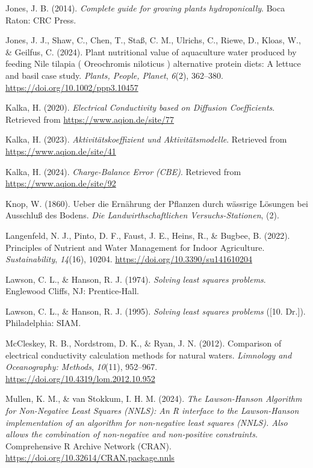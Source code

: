 \documentclass[
  letterpaper,
  DIV=11,
  numbers=noendperiod]{scrreprt}
\newlength{\cslhangindent}
\newenvironment{CSLReferences}[2] %
 {\begin{list}{}{%
  \setlength{\itemindent}{0pt}
  \setlength{\leftmargin}{0pt}
  \setlength{\parsep}{0pt}
  \ifodd #1
   \setlength{\leftmargin}{\cslhangindent}
   \setlength{\itemindent}{-1\cslhangindent}
  \fi
  \setlength{\itemsep}{#2\baselineskip}}}
 {\end{list}}
\begin{document}
\begin{CSLReferences}{1}{0}
Jones, J. B. (2014). \emph{{Complete guide for growing plants
hydroponically}}. Boca Raton: {CRC Press}.

Jones, J. J., Shaw, C., Chen, T., Staß, C. M., Ulrichs, C., Riewe, D.,
Kloas, W., \& Geilfus, C. (2024). {Plant nutritional value of
aquaculture water produced by feeding Nile tilapia ( Oreochromis
niloticus ) alternative protein diets: A lettuce and basil case study}.
\emph{{Plants, People, Planet}}, \emph{6}(2), 362--380.
\url{https://doi.org/10.1002/ppp3.10457}

Kalka, H. (2020). \emph{{Electrical Conductivity based on Diffusion
Coefficients}}. Retrieved from \url{https://www.aqion.de/site/77}

Kalka, H. (2023). \emph{{Aktivit{ä}tskoeffizient und
Aktivit{ä}tsmodelle}}. Retrieved from \url{https://www.aqion.de/site/41}

Kalka, H. (2024). \emph{{Charge-Balance Error (CBE)}}. Retrieved from
\url{https://www.aqion.de/site/92}

Knop, W. (1860). {Ueber die Ern{ä}hrung der Pflanzen durch w{ä}ssrige
L{ö}sungen bei Ausschlu{ß} des Bodens}. \emph{{Die Landwirthschaftlichen
Versuchs-Stationen}}, (2).

Langenfeld, N. J., Pinto, D. F., Faust, J. E., Heins, R., \& Bugbee, B.
(2022). {Principles of Nutrient and Water Management for Indoor
Agriculture}. \emph{{Sustainability}}, \emph{14}(16), 10204.
\url{https://doi.org/10.3390/su141610204}

Lawson, C. L., \& Hanson, R. J. (1974). \emph{{Solving least squares
problems}}. Englewood Cliffs, NJ: Prentice-Hall.

Lawson, C. L., \& Hanson, R. J. (1995). \emph{{Solving least squares
problems}} ({[}10. Dr.{]}). Philadelphia: SIAM.

McCleskey, R. B., Nordstrom, D. K., \& Ryan, J. N. (2012). {Comparison
of electrical conductivity calculation methods for natural waters}.
\emph{{Limnology and Oceanography: Methods}}, \emph{10}(11), 952--967.
\url{https://doi.org/10.4319/lom.2012.10.952}

Mullen, K. M., \& van Stokkum, I. H. M. (2024). \emph{{The Lawson-Hanson
Algorithm for Non-Negative Least Squares (NNLS): An R interface to the
Lawson-Hanson implementation of an algorithm for non-negative least
squares (NNLS). Also allows the combination of non-negative and
non-positive constraints.}} {Comprehensive R Archive Network (CRAN)}.
\url{https://doi.org/10.32614/CRAN.package.nnls}


\end{CSLReferences}
\end{document}
